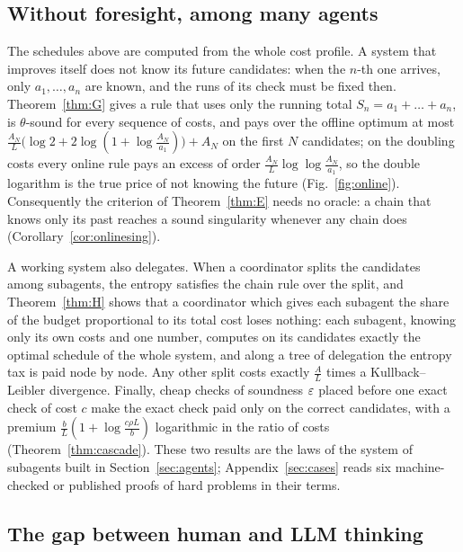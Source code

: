 \subsection{Without foresight, among many agents}

The schedules above are computed from the whole cost profile. A system that improves itself does not know its future candidates: when the $n$-th one arrives, only $a_{1},\dots,a_{n}$ are known, and the runs of its check must be fixed then. Theorem~\ref{thm:G} gives a rule that uses only the running total $S_{n}=a_{1}+\dots+a_{n}$, is $\theta$-sound for every sequence of costs, and pays over the offline optimum at most $\frac{A_{N}}{L}\bigl(\log2+2\log(1+\log\frac{A_{N}}{a_{1}})\bigr)+A_{N}$ on the first $N$ candidates; on the doubling costs every online rule pays an excess of order $\frac{A_{N}}{L}\log\log\frac{A_{N}}{a_{1}}$, so the double logarithm is the true price of not knowing the future (Fig.~\ref{fig:online}). Consequently the criterion of Theorem~\ref{thm:E} needs no oracle: a chain that knows only its past reaches a sound singularity whenever any chain does (Corollary~\ref{cor:onlinesing}).

A working system also delegates. When a coordinator splits the candidates among subagents, the entropy satisfies the chain rule over the split, and Theorem~\ref{thm:H} shows that a coordinator which gives each subagent the share of the budget proportional to its total cost loses nothing: each subagent, knowing only its own costs and one number, computes on its candidates exactly the optimal schedule of the whole system, and along a tree of delegation the entropy tax is paid node by node. Any other split costs exactly $\frac AL$ times a Kullback--Leibler divergence. Finally, cheap checks of soundness $\varepsilon$ placed before one exact check of cost $c$ make the exact check paid only on the correct candidates, with a premium $\frac bL(1+\log\frac{c\rho L}{b})$ logarithmic in the ratio of costs (Theorem~\ref{thm:cascade}). These two results are the laws of the system of subagents built in Section~\ref{sec:agents}; Appendix~\ref{sec:cases} reads six machine-checked or published proofs of hard problems in their terms.

\subsection{The gap between human and LLM thinking}

